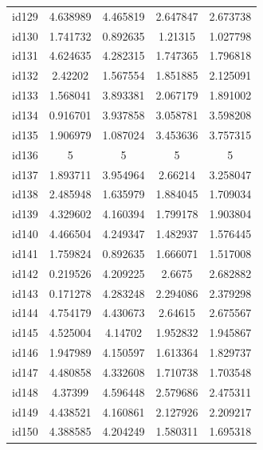 \documentclass[num-refs]{wiley-article}
\begin{document}
\begin{center}
\begin{longtable}{ccccc}
id129     & 4.638989  & 4.465819       & 2.647847          & 2.673738          \\
id130     & 1.741732  & 0.892635       & 1.21315           & 1.027798          \\
id131     & 4.624635  & 4.282315       & 1.747365          & 1.796818          \\
id132     & 2.42202   & 1.567554       & 1.851885          & 2.125091          \\
id133     & 1.568041  & 3.893381       & 2.067179          & 1.891002          \\
id134     & 0.916701  & 3.937858       & 3.058781          & 3.598208          \\
id135     & 1.906979  & 1.087024       & 3.453636          & 3.757315          \\
id136     & 5         & 5              & 5                 & 5                 \\
id137     & 1.893711  & 3.954964       & 2.66214           & 3.258047          \\
id138     & 2.485948  & 1.635979       & 1.884045          & 1.709034          \\
id139     & 4.329602  & 4.160394       & 1.799178          & 1.903804          \\
id140     & 4.466504  & 4.249347       & 1.482937          & 1.576445          \\
id141     & 1.759824  & 0.892635       & 1.666071          & 1.517008          \\
id142     & 0.219526  & 4.209225       & 2.6675            & 2.682882          \\
id143     & 0.171278  & 4.283248       & 2.294086          & 2.379298          \\
id144     & 4.754179  & 4.430673       & 2.64615           & 2.675567          \\
id145     & 4.525004  & 4.14702        & 1.952832          & 1.945867          \\
id146     & 1.947989  & 4.150597       & 1.613364          & 1.829737          \\
id147     & 4.480858  & 4.332608       & 1.710738          & 1.703548          \\
id148     & 4.37399   & 4.596448       & 2.579686          & 2.475311          \\
id149     & 4.438521  & 4.160861       & 2.127926          & 2.209217          \\
id150     & 4.388585  & 4.204249       & 1.580311          & 1.695318          \\

\end{longtable}
\end{center}
\end{document}
